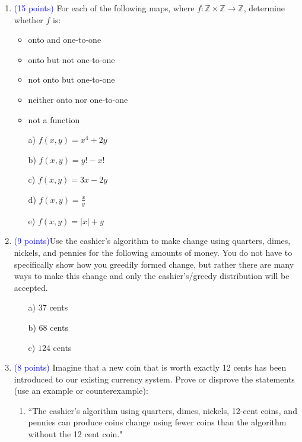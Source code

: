 \documentclass{article}
\newcommand{\pt}[1]{\textcolor{blue}{(#1 points)}}
\begin{document}
\begin{enumerate}
    \item \pt{15} For each of the following maps, where $f : \mathbb{Z}\times\mathbb{Z} \rightarrow \mathbb{Z}$, determine whether $f$ is: 

\begin{itemize}
    \item onto and one-to-one
    \item onto but not one-to-one
    \item not onto but one-to-one
    \item neither onto nor one-to-one
    \item not a function
\end{itemize}


\begin{enumerate}
    \item[a)] $f(x, y) = x^4 + 2y$
    \item[b)] $f(x, y) = y! -  x!$
    \item[c)] $f(x, y) = 3x - 2y$
    \item[d)] $f(x, y) = \frac{x}{y}$
    \item[e)] $f(x, y) = |x| + y$
\end{enumerate}

\item \pt{9}Use the cashier's algorithm to make change using quarters, dimes, nickels, and pennies for the following amounts of money. You do not have to specifically show how you greedily formed change, but rather there are many ways to make this change and only the cashier's/greedy distribution will be accepted.
\begin{enumerate}
\item[a)] $37$ cents
\item[b)] $68$ cents
\item[c)] $124$ cents

\end{enumerate}

\item \pt{8} Imagine that a new coin that is worth exactly 12 cents has been introduced to our existing currency system. Prove or disprove the statements (use an example or counterexample):
\begin{enumerate}
    \item ``The cashier's algorithm using quarters, dimes, nickels,  12-cent coins, and pennies can produce coins change using fewer coins than the algorithm without the 12 cent coin."
    

\end{enumerate}
\end{enumerate}
\end{document}
